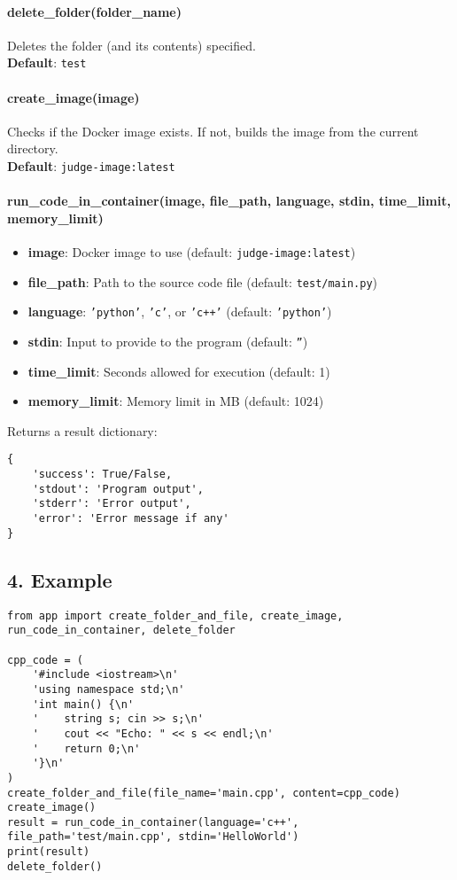 \documentclass{article}
\begin{document}
\paragraph{delete\_folder(folder\_name)}
Deletes the folder (and its contents) specified.\\
\textbf{Default}: \texttt{test}

\paragraph{create\_image(image)}
Checks if the Docker image exists. If not, builds the image from the current directory.\\
\textbf{Default}: \texttt{judge-image:latest}

\paragraph{run\_code\_in\_container(image, file\_path, language, stdin, time\_limit, memory\_limit)}
\begin{itemize}
    \item \textbf{image}: Docker image to use (default: \texttt{judge-image:latest})
    \item \textbf{file\_path}: Path to the source code file (default: \texttt{test/main.py})
    \item \textbf{language}: \texttt{'python'}, \texttt{'c'}, or \texttt{'c++'} (default: \texttt{'python'})
    \item \textbf{stdin}: Input to provide to the program (default: \texttt{''})
    \item \textbf{time\_limit}: Seconds allowed for execution (default: 1)
    \item \textbf{memory\_limit}: Memory limit in MB (default: 1024)
\end{itemize}

Returns a result dictionary:
\begin{verbatim}
{
    'success': True/False,
    'stdout': 'Program output',
    'stderr': 'Error output',
    'error': 'Error message if any'
}
\end{verbatim}

\subsection*{4. Example}
\begin{verbatim}
from app import create_folder_and_file, create_image, run_code_in_container, delete_folder

cpp_code = (
    '#include <iostream>\n'
    'using namespace std;\n'
    'int main() {\n'
    '    string s; cin >> s;\n'
    '    cout << "Echo: " << s << endl;\n'
    '    return 0;\n'
    '}\n'
)
create_folder_and_file(file_name='main.cpp', content=cpp_code)
create_image()
result = run_code_in_container(language='c++', file_path='test/main.cpp', stdin='HelloWorld')
print(result)
delete_folder()
\end{verbatim}
\end{document}

